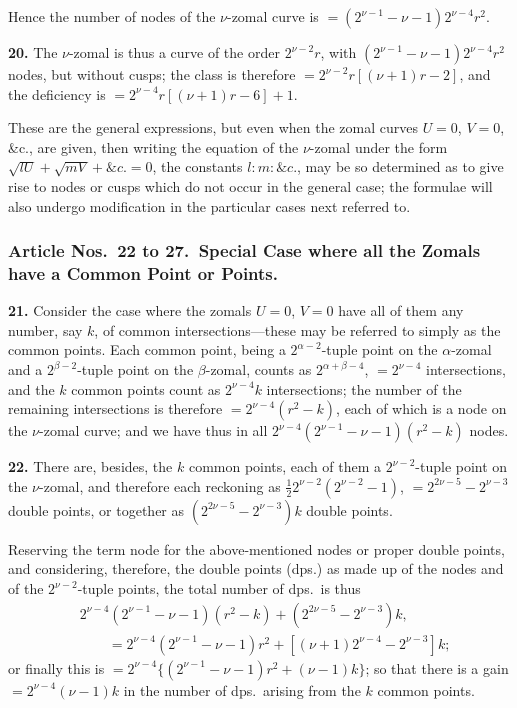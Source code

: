\documentclass[11pt,a4paper]{article}
\theoremstyle{definition}
\begin{document}
Hence the number of nodes of the $\nu$-zomal curve is $=(2^{\nu-1}-\nu-1)2^{\nu-4}r^2$.

\setcounter{page}{480}

\noindent\textbf{20.} The $\nu$-zomal is thus a curve of the order $2^{\nu-2}r$, with $(2^{\nu-1}-\nu-1)2^{\nu-4}r^2$ nodes, but without cusps; the class is therefore $=2^{\nu-2}r[(\nu+1)r-2]$, and the deficiency is $=2^{\nu-4}r[(\nu+1)r-6]+1$.

These are the general expressions, but even when the zomal curves $U=0$, $V=0$, \&c., are given, then writing the equation of the $\nu$-zomal under the form $\sqrt{lU}+\sqrt{mV}+\&c.=0$, the constants $l:m:\&c.$, may be so determined as to give rise to nodes or cusps which do not occur in the general case; the formulae will also undergo modification in the particular cases next referred to.

\subsubsection*{Article Nos.\ 22 to 27.\ Special Case where all the Zomals have a Common Point or Points.}

\noindent\textbf{21.} Consider the case where the zomals $U=0$, $V=0$ have all of them any number, say $k$, of common intersections---these may be referred to simply as the common points. Each common point, being a $2^{\alpha-2}$-tuple point on the $\alpha$-zomal and a $2^{\beta-2}$-tuple point on the $\beta$-zomal, counts as $2^{\alpha+\beta-4}$, $=2^{\nu-4}$ intersections, and the $k$ common points count as $2^{\nu-4}k$ intersections; the number of the remaining intersections is therefore $=2^{\nu-4}(r^2-k)$, each of which is a node on the $\nu$-zomal curve; and we have thus in all $2^{\nu-4}(2^{\nu-1}-\nu-1)(r^2-k)$ nodes.

\noindent\textbf{22.} There are, besides, the $k$ common points, each of them a $2^{\nu-2}$-tuple point on the $\nu$-zomal, and therefore each reckoning as $\frac{1}{2}2^{\nu-2}(2^{\nu-2}-1)$, $=2^{2\nu-5}-2^{\nu-3}$ double points, or together as $(2^{2\nu-5}-2^{\nu-3})k$ double points.

Reserving the term node for the above-mentioned nodes or proper double points, and considering, therefore, the double points (dps.) as made up of the nodes and of the $2^{\nu-2}$-tuple points, the total number of dps.\ is thus
\begin{align*}
&2^{\nu-4}(2^{\nu-1}-\nu-1)(r^2-k)+(2^{2\nu-5}-2^{\nu-3})k,\\
&\qquad=2^{\nu-4}(2^{\nu-1}-\nu-1)r^2+[(\nu+1)2^{\nu-4}-2^{\nu-3}]k;
\end{align*}
or finally this is $=2^{\nu-4}\{(2^{\nu-1}-\nu-1)r^2+(\nu-1)k\}$; so that there is a gain $=2^{\nu-4}(\nu-1)k$ in the number of dps.\ arising from the $k$ common points.
\end{document}
